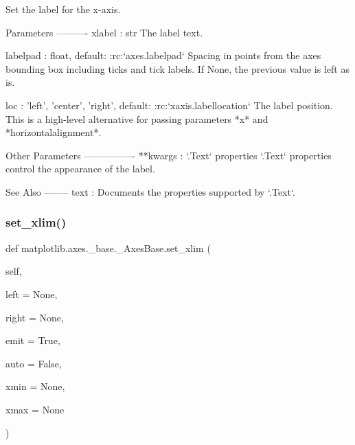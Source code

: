 \begin{DoxyVerb}Set the label for the x-axis.

Parameters
----------
xlabel : str
    The label text.

labelpad : float, default: :rc:`axes.labelpad`
    Spacing in points from the axes bounding box including ticks
    and tick labels.  If None, the previous value is left as is.

loc : {'left', 'center', 'right'}, default: :rc:`xaxis.labellocation`
    The label position. This is a high-level alternative for passing
    parameters *x* and *horizontalalignment*.

Other Parameters
----------------
**kwargs : `.Text` properties
    `.Text` properties control the appearance of the label.

See Also
--------
text : Documents the properties supported by `.Text`.
\end{DoxyVerb}
 \mbox{\label{classmatplotlib_1_1axes_1_1__base_1_1__AxesBase_a99a2478a357038988eb69918eddceda5}} 
\subsubsection{\texorpdfstring{set\+\_\+xlim()}{set\_xlim()}}
{\footnotesize\ttfamily def matplotlib.\+axes.\+\_\+base.\+\_\+\+Axes\+Base.\+set\+\_\+xlim (\begin{DoxyParamCaption}\item[{}]{self,  }\item[{}]{left = {\ttfamily None},  }\item[{}]{right = {\ttfamily None},  }\item[{}]{emit = {\ttfamily True},  }\item[{}]{auto = {\ttfamily False},  }\item[{}]{xmin = {\ttfamily None},  }\item[{}]{xmax = {\ttfamily None} }\end{DoxyParamCaption})}

